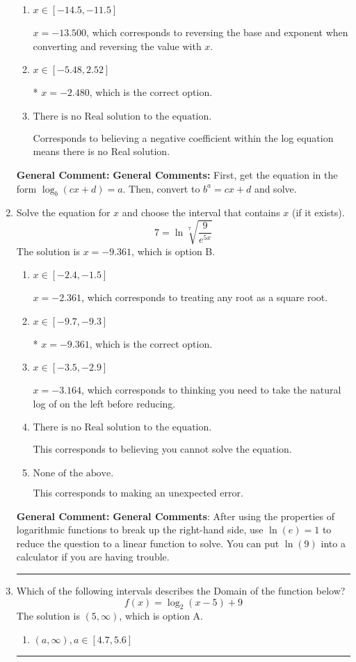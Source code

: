 \documentclass{extbook}[14pt]
\newcommand{\litem}[1]{\item #1

\rule{\textwidth}{0.4pt}}
\begin{document}
\begin{enumerate}
{\begin{enumerate}[label=\Alph*.]
$x = -18.500$, which corresponds to reversing the base and exponent when converting.
\item \( x \in [-14.5, -11.5] \)

$x = -13.500$, which corresponds to reversing the base and exponent when converting and reversing the value with $x$.
\item \( x \in [-5.48, 2.52] \)

* $x = -2.480$, which is the correct option.
\item \( \text{There is no Real solution to the equation.} \)

Corresponds to believing a negative coefficient within the log equation means there is no Real solution.
\end{enumerate}

\textbf{General Comment:} \textbf{General Comments:} First, get the equation in the form $\log_b{(cx+d)} = a$. Then, convert to $b^a = cx+d$ and solve.
}
\litem{
 Solve the equation for $x$ and choose the interval that contains $x$ (if it exists).
\[  7 = \ln{\sqrt[7]{\frac{9}{e^{5x}}}} \]The solution is \( x = -9.361 \), which is option B.\begin{enumerate}[label=\Alph*.]
\item \( x \in [-2.4, -1.5] \)

$x = -2.361$, which corresponds to treating any root as a square root.
\item \( x \in [-9.7, -9.3] \)

* $x = -9.361$, which is the correct option.
\item \( x \in [-3.5, -2.9] \)

$x = -3.164$, which corresponds to thinking you need to take the natural log of on the left before reducing.
\item \( \text{There is no Real solution to the equation.} \)

This corresponds to believing you cannot solve the equation.
\item \( \text{None of the above.} \)

This corresponds to making an unexpected error.
\end{enumerate}

\textbf{General Comment:} \textbf{General Comments}: After using the properties of logarithmic functions to break up the right-hand side, use $\ln(e) = 1$ to reduce the question to a linear function to solve. You can put $\ln(9)$ into a calculator if you are having trouble.
}
\litem{
Which of the following intervals describes the Domain of the function below?
\[ f(x) = \log_2{(x-5)}+9 \]The solution is \( (5, \infty) \), which is option A.\begin{enumerate}[label=\Alph*.]
\item \( (a, \infty), a \in [4.7, 5.6] \)


\end{enumerate}}
\end{enumerate}
\end{document}
